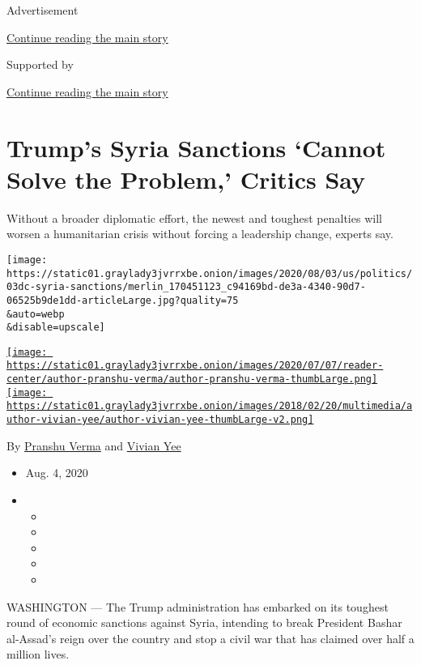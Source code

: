 Advertisement

\protect\hyperlink{after-top}{Continue reading the main story}

Supported by

\protect\hyperlink{after-sponsor}{Continue reading the main story}

\hypertarget{trumps-syria-sanctions-cannot-solve-the-problem-critics-say}{%
\section{Trump's Syria Sanctions `Cannot Solve the Problem,' Critics
Say}\label{trumps-syria-sanctions-cannot-solve-the-problem-critics-say}}

Without a broader diplomatic effort, the newest and toughest penalties
will worsen a humanitarian crisis without forcing a leadership change,
experts say.

\texttt{[image: https://static01.graylady3jvrrxbe.onion/images/2020/08/03/us/politics/03dc-syria-sanctions/merlin\_170451123\_c94169bd-de3a-4340-90d7-06525b9de1dd-articleLarge.jpg?quality=75\\\&auto=webp\\\&disable=upscale]}

\href{https://www.nytimes3xbfgragh.onion/by/pranshu-verma}{\texttt{[image: https://static01.graylady3jvrrxbe.onion/images/2020/07/07/reader-center/author-pranshu-verma/author-pranshu-verma-thumbLarge.png]}}\href{https://www.nytimes3xbfgragh.onion/by/vivian-yee}{\texttt{[image: https://static01.graylady3jvrrxbe.onion/images/2018/02/20/multimedia/author-vivian-yee/author-vivian-yee-thumbLarge-v2.png]}}

By \href{https://www.nytimes3xbfgragh.onion/by/pranshu-verma}{Pranshu
Verma} and
\href{https://www.nytimes3xbfgragh.onion/by/vivian-yee}{Vivian Yee}

\begin{itemize}
\item
  Aug. 4, 2020
\item
  \begin{itemize}
  \item
  \item
  \item
  \item
  \item
  \end{itemize}
\end{itemize}

WASHINGTON --- The Trump administration has embarked on its toughest
round of economic sanctions against Syria, intending to break President
Bashar al-Assad's reign over the country and stop a civil war that has
claimed over half a million lives.


